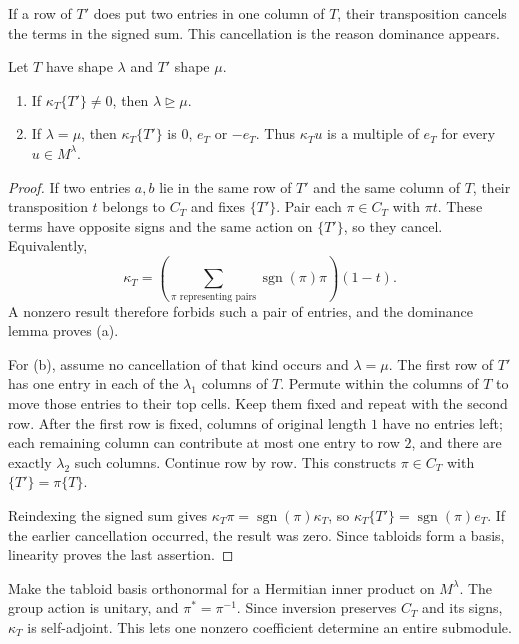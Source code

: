 If a row of $T'$ does put two entries in one column of $T$, their transposition cancels the terms in the signed sum. This cancellation is the reason dominance appears.

\begin{lemma}\label{lem:kappa}
Let $T$ have shape $\lambda$ and $T'$ shape $\mu$.
\begin{enumerate}[label=(\alph*)]
\item If $\kappa_T\{T'\}\ne0$, then $\lambda\trianglerighteq\mu$.
\item If $\lambda=\mu$, then $\kappa_T\{T'\}$ is $0$, $e_T$ or $-e_T$. Thus $\kappa_Tu$ is a multiple of $e_T$ for every $u\in M^\lambda$.
\end{enumerate}
\end{lemma}

\begin{proof}
If two entries $a,b$ lie in the same row of $T'$ and the same column of $T$, their transposition $t$ belongs to $C_T$ and fixes $\{T'\}$. Pair each $\pi\in C_T$ with $\pi t$. These terms have opposite signs and the same action on $\{T'\}$, so they cancel. Equivalently,
\[
\kappa_T=\left(\sum_{\pi\text{ representing pairs}}
\operatorname{sgn}(\pi)\pi\right)(1-t).
\]
A nonzero result therefore forbids such a pair of entries, and the dominance lemma proves (a).

For (b), assume no cancellation of that kind occurs and $\lambda=\mu$. The first row of $T'$ has one entry in each of the $\lambda_1$ columns of $T$. Permute within the columns of $T$ to move those entries to their top cells. Keep them fixed and repeat with the second row. After the first row is fixed, columns of original length $1$ have no entries left; each remaining column can contribute at most one entry to row $2$, and there are exactly $\lambda_2$ such columns. Continue row by row. This constructs $\pi\in C_T$ with $\{T'\}=\pi\{T\}$.

Reindexing the signed sum gives $\kappa_T\pi=\operatorname{sgn}(\pi)\kappa_T$, so
$\kappa_T\{T'\}=\operatorname{sgn}(\pi)e_T$.
If the earlier cancellation occurred, the result was zero. Since tabloids form a basis, linearity proves the last assertion.
\end{proof}

Make the tabloid basis orthonormal for a Hermitian inner product on $M^\lambda$. The group action is unitary, and $\pi^*=\pi^{-1}$. Since inversion preserves $C_T$ and its signs, $\kappa_T$ is self-adjoint. This lets one nonzero coefficient determine an entire submodule.

